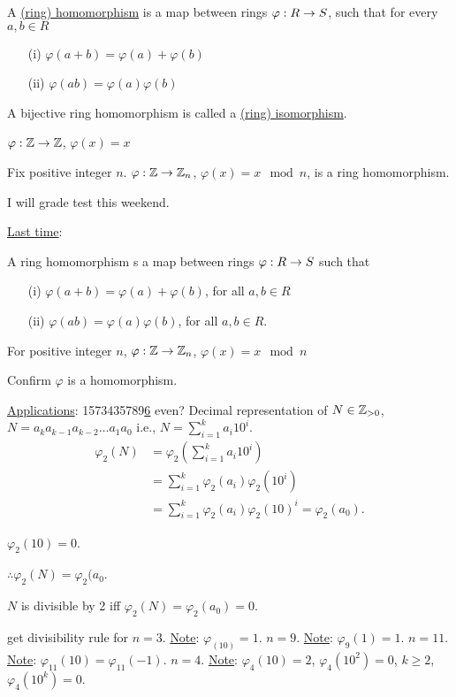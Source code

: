 \documentclass[]{article}
\begin{document}
\begin{definition}
	A \ul{(ring) homomorphism} is a map between rings $\varphi:R\rightarrow S$, such that for every $a,b\in R$
	\begin{itemize}
		\item[(i)] $\varphi(a+b)=\varphi(a)+\varphi(b)$
		\item[(ii)] $\varphi(ab)=\varphi(a)\varphi(b)$
	\end{itemize}
	A bijective ring homomorphism is called a \ul{(ring) isomorphism}.
\end{definition}
\begin{example}
	$\varphi:\mathbb{Z}\rightarrow\mathbb{Z}$, $\varphi(x)=x$
\end{example}
\begin{example}
	Fix positive integer $n$. $\varphi:\mathbb{Z}\rightarrow\mathbb{Z}_n$, $\varphi(x)=x\mod n$, is a ring homomorphism.
\end{example}

I will grade test this weekend.

\ul{Last time}:
\begin{definition}
	A ring homomorphism s a map between rings $\varphi:R\rightarrow S$ such that
	\begin{itemize}
		\item[(i)] $\varphi(a+b)=\varphi(a)+\varphi(b)$, for all $a,b\in R$
		\item[(ii)] $\varphi(ab)=\varphi(a)\varphi(b)$, for all $a,b\in R$.
	\end{itemize}
\end{definition}
For positive integer $n$, $\varphi:\mathbb{Z}\rightarrow\mathbb{Z}_n$, $\varphi(x)=x\mod n$ 
\begin{xca}
	Confirm $\varphi$ is a homomorphism.
\end{xca}
\ul{Applications}: 1573435789\ul{6} even?
Decimal representation of $N\in\mathbb{Z}_{>0}$, $N=a_ka_{k-1}a_{k-2}\dots a_1a_0$ i.e., $N=\sum_{i=1}^k a_i 10^i$.
\begin{align*}
	\varphi_2(N) &= \varphi_2(\sum_{i=1}^k a_i10^i) \\
				 &= \sum_{i=1}^k \varphi_2(a_i)\varphi_2(10^i) \\
				 &= \sum_{i=1}^k \varphi_2(a_i)\varphi_2(10)^i = \varphi_2(a_0).
\end{align*}
\begin{note}
	$\varphi_2(10)=0$.
\end{note}
$\therefore \varphi_2(N)=\varphi_2(a_0$.
\begin{note}
	$N$ is divisible by 2 iff $\varphi_2(N)=\varphi_2(a_0)=0$.
\end{note}
\begin{xca}
	get divisibility rule for $n=3$. \ul{Note}: $\varphi_(10)=1$.
	$n=9$. \ul{Note}: $\varphi_9(1)=1$.
	$n=11$. \ul{Note}: $\varphi_{11}(10) = \varphi_{11}(-1)$.
	$n=4$. \ul{Note}: $\varphi_4(10) = 2$, $\varphi_4(10^2)=0$, $k\geq2$, $\varphi_4(10^k)=0$.
\end{xca}
\end{document}

